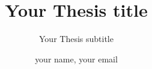 \documentclass{./llncs2e/llncs}
\begin{document}
\title{Your Thesis title}

\subtitle{Your Thesis subtitle}
\author{your name, your email}

\maketitle

\setcounter{tocdepth}{2}
\makeatletter
\renewcommand*\l@author[2]{}
\renewcommand*\l@title[2]{}
\makeatletter

\cleardoublepage



\cleardoublepage
\tableofcontents
\cleardoublepage
\pagestyle{plain}

\cleardoublepage

\cleardoublepage

\cleardoublepage

\cleardoublepage

\cleardoublepage

\cleardoublepage
\newpage
\appendix

\cleardoublepage


%
%


\end{document}
